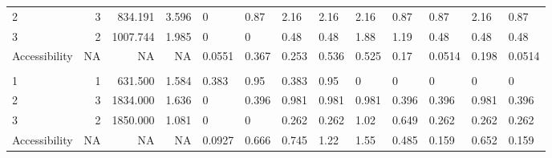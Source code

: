 \documentclass[10pt,letterpaper]{article}
\begin{document}
\begin{landscape}
\begin{table}[t]
\begin{tabular}{lrrrlllllllll}
\hspace{1em}2 & 3 & 834.191 & 3.596 & \textcolor[HTML]{FCCE25}{0} & \textcolor[HTML]{C7427C}{0.87} & \textcolor[HTML]{0D0887}{2.16} & \textcolor[HTML]{18068B}{2.16} & \textcolor[HTML]{0D0887}{2.16} & \textcolor[HTML]{8004A8}{0.87} & \textcolor[HTML]{8004A8}{0.87} & \textcolor[HTML]{0D0887}{2.16} & \textcolor[HTML]{8004A8}{0.87}\\
\hspace{1em}3 & 2 & 1007.744 & 1.985 & \textcolor[HTML]{FCCE25}{0} & \textcolor[HTML]{FCCE25}{0} & \textcolor[HTML]{FCA438}{0.48} & \textcolor[HTML]{FCA537}{0.48} & \textcolor[HTML]{4903A0}{1.88} & \textcolor[HTML]{18068B}{1.19} & \textcolor[HTML]{D5546E}{0.48} & \textcolor[HTML]{F1834C}{0.48} & \textcolor[HTML]{D5546E}{0.48}\\
\hspace{1em}Accessibility & NA & NA & NA & \textcolor[HTML]{FDB32F}{0.0551} & \textcolor[HTML]{F58C46}{0.367} & \textcolor[HTML]{FCCE25}{0.253} & \textcolor[HTML]{FA9C3C}{0.536} & \textcolor[HTML]{EF7D50}{0.525} & \textcolor[HTML]{FA9C3C}{0.17} & \textcolor[HTML]{FEBE2A}{0.0514} & \textcolor[HTML]{FDAE32}{0.198} & \textcolor[HTML]{FEBE2A}{0.0514}\\
\addlinespace[0.3em]
\multicolumn{13}{l}{\textbf{M2SFCA}}\\
\hspace{1em}1 & 1 & 631.500 & 1.584 & \textcolor[HTML]{BD3886}{0.383} & \textcolor[HTML]{BD3886}{0.95} & \textcolor[HTML]{FDB52E}{0.383} & \textcolor[HTML]{DD5E66}{0.95} & \textcolor[HTML]{FCCE25}{0} & \textcolor[HTML]{FCCE25}{0} & \textcolor[HTML]{FCCE25}{0} & \textcolor[HTML]{FCCE25}{0} & \textcolor[HTML]{FCCE25}{0}\\
\hspace{1em}2 & 3 & 1834.000 & 1.636 & \textcolor[HTML]{FCCE25}{0} & \textcolor[HTML]{F3874A}{0.396} & \textcolor[HTML]{D8576B}{0.981} & \textcolor[HTML]{DA5A6A}{0.981} & \textcolor[HTML]{C9447A}{0.981} & \textcolor[HTML]{E26660}{0.396} & \textcolor[HTML]{E26660}{0.396} & \textcolor[HTML]{C9447A}{0.981} & \textcolor[HTML]{E26660}{0.396}\\
\hspace{1em}3 & 2 & 1850.000 & 1.081 & \textcolor[HTML]{FCCE25}{0} & \textcolor[HTML]{FCCE25}{0} & \textcolor[HTML]{FCCC25}{0.262} & \textcolor[HTML]{FCCE25}{0.262} & \textcolor[HTML]{C6417E}{1.02} & \textcolor[HTML]{B52F8C}{0.649} & \textcolor[HTML]{F3854B}{0.262} & \textcolor[HTML]{FCA238}{0.262} & \textcolor[HTML]{F3854B}{0.262}\\
\hspace{1em}Accessibility & NA & NA & NA & \textcolor[HTML]{FCA238}{0.0927} & \textcolor[HTML]{DE5E65}{0.666} & \textcolor[HTML]{ED7953}{0.745} & \textcolor[HTML]{BF3984}{1.22} & \textcolor[HTML]{8004A8}{1.55} & \textcolor[HTML]{D5536F}{0.485} & \textcolor[HTML]{FB9F3A}{0.159} & \textcolor[HTML]{E66C5C}{0.652} & \textcolor[HTML]{FB9F3A}{0.159}\\

\end{tabular}
\end{table}
\end{landscape}
\end{document}

